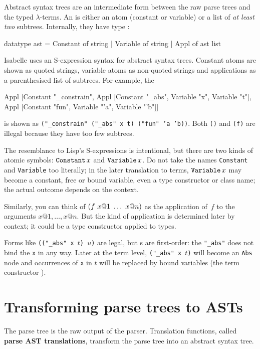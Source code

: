 Abstract syntax trees are an intermediate form between the raw parse trees
and the typed $\lambda$-terms.  An \AST{} is either an atom (constant or
variable) or a list of {\em at least two\/} subtrees.  Internally, they
have type :  
\begin{ttbox}
datatype ast = Constant of string
             | Variable of string
             | Appl of ast list
\end{ttbox}
%
Isabelle uses an S-expression syntax for abstract syntax trees.  Constant
atoms are shown as quoted strings, variable atoms as non-quoted strings and
applications as a parenthesised list of subtrees.  For example, the \AST
\begin{ttbox}
Appl [Constant "_constrain",
      Appl [Constant "_abs", Variable "x", Variable "t"],
      Appl [Constant "fun", Variable "'a", Variable "'b"]]
\end{ttbox}
is shown as {\tt ("_constrain" ("_abs" x t) ("fun" 'a 'b))}.
Both {\tt ()} and {\tt (f)} are illegal because they have too few
subtrees.

The resemblance to Lisp's S-expressions is intentional, but there are two
kinds of atomic symbols: $\mathop{\mbox{\tt Constant}}\nolimits x$ and $\mathop{\mbox{\tt Variable}}\nolimits x$.  Do not take the
names {\tt Constant} and {\tt Variable} too literally; in the later
translation to terms, $\mathop{\mbox{\tt Variable}}\nolimits x$ may become a constant, free or bound
variable, even a type constructor or class name; the actual outcome depends
on the context.

Similarly, you can think of ${\tt (} f~x@1~\ldots~x@n{\tt )}$ as the
application of~$f$ to the arguments $x@1, \ldots, x@n$.  But the kind of
application is determined later by context; it could be a type constructor
applied to types.

Forms like {\tt (("_abs" x $t$) $u$)} are legal, but \AST{}s are
first-order: the {\tt "_abs"} does not bind the {\tt x} in any way.  Later
at the term level, {\tt ("_abs" x $t$)} will become an {\tt Abs} node and
occurrences of {\tt x} in $t$ will be replaced by bound variables (the term
constructor ).


\section{Transforming parse trees to ASTs}\label{sec:astofpt}
\newcommand\astofpt[1]{\lbrakk#1\rbrakk}

The parse tree is the raw output of the parser.  Translation functions,
called {\bf parse AST translations},
transform the parse tree into an abstract syntax tree.

